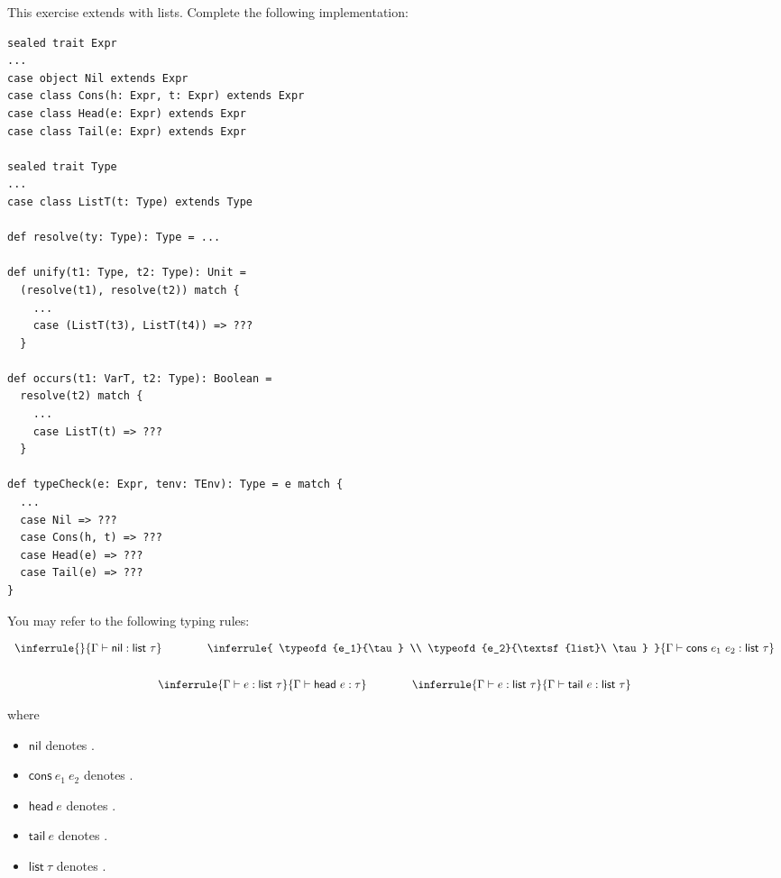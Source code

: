 \begin{exercise}

This exercise extends \Lang with lists. Complete the following implementation:
\begin{verbatim}
sealed trait Expr
...
case object Nil extends Expr
case class Cons(h: Expr, t: Expr) extends Expr
case class Head(e: Expr) extends Expr
case class Tail(e: Expr) extends Expr

sealed trait Type
...
case class ListT(t: Type) extends Type

def resolve(ty: Type): Type = ...

def unify(t1: Type, t2: Type): Unit =
  (resolve(t1), resolve(t2)) match {
    ...
    case (ListT(t3), ListT(t4)) => ???
  }

def occurs(t1: VarT, t2: Type): Boolean =
  resolve(t2) match {
    ...
    case ListT(t) => ???
  }

def typeCheck(e: Expr, tenv: TEnv): Type = e match {
  ...
  case Nil => ???
  case Cons(h, t) => ???
  case Head(e) => ???
  case Tail(e) => ???
}
\end{verbatim}

You may refer to the following typing rules:

\[
\begin{array}{c}
  \inferrule
  {}
  { \typeofd{\textsf{nil}}{\textsf{list}\ \tau} }
  \qquad\qquad
  \inferrule
  { \typeofd{e_1}{\tau} \\ \typeofd{e_2}{\textsf{list}\ \tau} }
  { \typeofd{\textsf{cons}\ e_1\ e_2}{\textsf{list}\ \tau} }
  \\[2em]
  \inferrule
  { \typeofd{e}{\textsf{list}\ \tau} }
  { \typeofd{\textsf{head}\ e}{\tau} }
  \qquad\qquad
  \inferrule
  { \typeofd{e}{\textsf{list}\ \tau} }
  { \typeofd{\textsf{tail}\ e}{\textsf{list}\ \tau} }
\end{array}
\]

where

\begin{itemize}
  \item $\textsf{nil}$ denotes .
  \item $\textsf{cons}\ e_1\ e_2$ denotes .
  \item $\textsf{head}\ e$ denotes .
  \item $\textsf{tail}\ e$ denotes .
  \item $\textsf{list}\ \tau$ denotes .
\end{itemize}

\end{exercise}

